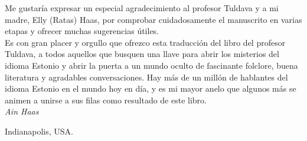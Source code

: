 Me gustaría expresar un especial agradecimiento al profesor Tuldava y a mi madre, Elly (Ratas) Haas, por comprobar cuidadosamente el manuscrito en varias etapas y ofrecer muchas sugerencias útiles.\\

Es con gran placer y orgullo que ofrezco esta traducción del libro del profesor Tuldava, a todos aquellos que busquen una llave para abrir los misterios del idioma Estonio y abrir la puerta a un mundo oculto de fascinante folclore, buena literatura y agradables conversaciones. Hay más de un millón de hablantes del idioma Estonio en el mundo hoy en día, y es mi mayor anelo que algunos más se animen a unirse a sus filas como resultado de este libro.\\

\hfill \textit{Ain Haas}

\hfill Indianapolis, USA.



